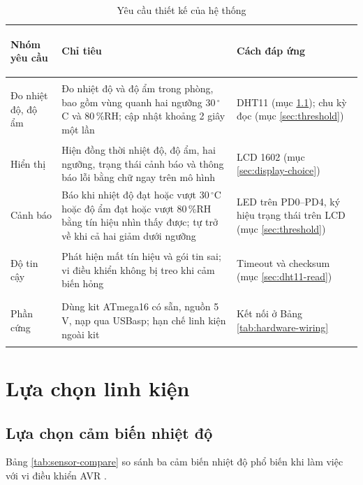 \begin{table}[H]
\centering
\small
\caption{Yêu cầu thiết kế của hệ thống}
\label{tab:requirements}
\renewcommand{\arraystretch}{1.15}
\begin{tabularx}{\textwidth}{>{\bfseries\raggedright\arraybackslash}p{2.3cm} >{\raggedright\arraybackslash}X >{\raggedright\arraybackslash}p{4.2cm}}
\toprule
Nhóm yêu cầu & Chỉ tiêu & Cách đáp ứng \\
\midrule
Đo nhiệt độ, độ ẩm & Đo nhiệt độ và độ ẩm trong phòng, bao gồm vùng quanh hai ngưỡng 30\,$^\circ$C và 80\,\%RH; cập nhật khoảng 2 giây một lần & DHT11 (mục \ref{sec:sensor-choice}); chu kỳ đọc (mục \ref{sec:threshold}) \\
Hiển thị & Hiện đồng thời nhiệt độ, độ ẩm, hai ngưỡng, trạng thái cảnh báo và thông báo lỗi bằng chữ ngay trên mô hình & LCD 1602 (mục \ref{sec:display-choice}) \\
Cảnh báo & Báo khi nhiệt độ đạt hoặc vượt 30\,$^\circ$C hoặc độ ẩm đạt hoặc vượt 80\,\%RH bằng tín hiệu nhìn thấy được; tự trở về khi cả hai giảm dưới ngưỡng & 5 LED trên PD0--PD4, ký hiệu trạng thái trên LCD (mục \ref{sec:threshold}) \\
Độ tin cậy & Phát hiện mất tín hiệu và gói tin sai; vi điều khiển không bị treo khi cảm biến hỏng & Timeout và checksum (mục \ref{sec:dht11-read}) \\
Phần cứng & Dùng kit ATmega16 có sẵn, nguồn 5\,V, nạp qua USBasp; hạn chế linh kiện ngoài kit & Kết nối ở Bảng \ref{tab:hardware-wiring} \\
\bottomrule
\end{tabularx}
\end{table}

\section{Lựa chọn linh kiện}

\subsection{Lựa chọn cảm biến nhiệt độ}
\label{sec:sensor-choice}

Bảng \ref{tab:sensor-compare} so sánh ba cảm biến nhiệt độ phổ biến khi làm việc với vi điều khiển AVR \cite{dht11-datasheet,lm35-datasheet,ds18b20-datasheet}.

